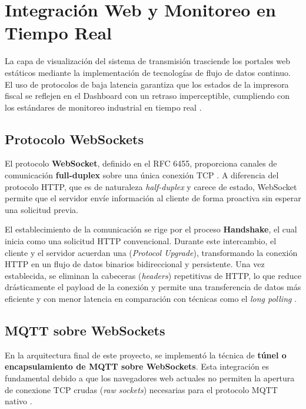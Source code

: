 \section{Integración Web y Monitoreo en Tiempo Real}

\par La capa de visualizaci\'on del sistema de transmisi\'on trasciende los portales web est\'aticos mediante la implementaci\'on de tecnolog\'ias de flujo de datos continuo. El uso de protocolos de baja latencia garantiza que los estados de la impresora fiscal se reflejen en el Dashboard con un retraso imperceptible, cumpliendo con los est\'andares de monitoreo industrial en tiempo real \cite{RFC6455_WebSockets}.

\subsection{Protocolo WebSockets}

\par El protocolo \textbf{WebSocket}, definido en el RFC 6455, proporciona canales de comunicaci\'on \textbf{full-duplex} sobre una \'unica conexi\'on TCP \cite{RFC6455_WebSockets}. A diferencia del protocolo HTTP, que es de naturaleza \textit{half-duplex} y carece de estado, WebSocket permite que el servidor env\'ie informaci\'on al cliente de forma proactiva sin esperar una solicitud previa.\\

\par El establecimiento de la comunicaci\'on se rige por el proceso \textbf{Handshake}, el cual inicia como una solicitud HTTP convencional. Durante este intercambio, el cliente y el servidor acuerdan una  (\textit{Protocol Upgrade}), transformando la conexi\'on HTTP en un flujo de datos binarios bidireccional y persistente. Una vez establecida, se eliminan la cabeceras (\textit{headers}) repetitivas de HTTP, lo que reduce dr\'asticamente el payload de la conexi\'on y permite una transferencia de datos m\'as eficiente y con menor latencia en comparaci\'on con t\'ecnicas como el \textit{long polling} \cite{Fierro_WebSockets_2017}.

\subsection{MQTT sobre WebSockets}

\par En la arquitectura final de este proyecto, se implement\'o la t\'ecnica de \textbf{t\'unel o encapsulamiento de MQTT sobre WebSockets}. Esta integraci\'on es fundamental debido a que los navegadores web actuales no permiten la apertura de conexione TCP crudas (\textit{raw sockets}) necesarias para el protocolo MQTT nativo \cite{OASIS_MQTT_v5, Fierro_WebSockets_2017}.\\

